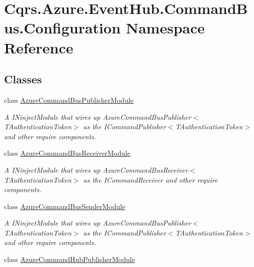 \hypertarget{namespaceCqrs_1_1Azure_1_1EventHub_1_1CommandBus_1_1Configuration}{}\section{Cqrs.\+Azure.\+Event\+Hub.\+Command\+Bus.\+Configuration Namespace Reference}
\label{namespaceCqrs_1_1Azure_1_1EventHub_1_1CommandBus_1_1Configuration}
\subsection*{Classes}
\begin{DoxyCompactItemize}
\item 
class \hyperlink{classCqrs_1_1Azure_1_1EventHub_1_1CommandBus_1_1Configuration_1_1AzureCommandBusPublisherModule}{Azure\+Command\+Bus\+Publisher\+Module}
\begin{DoxyCompactList}\small\item\em A I\+Ninject\+Module that wires up Azure\+Command\+Bus\+Publisher$<$\+T\+Authentication\+Token$>$ as the I\+Command\+Publisher$<$\+T\+Authentication\+Token$>$ and other require components. \end{DoxyCompactList}\item 
class \hyperlink{classCqrs_1_1Azure_1_1EventHub_1_1CommandBus_1_1Configuration_1_1AzureCommandBusReceiverModule}{Azure\+Command\+Bus\+Receiver\+Module}
\begin{DoxyCompactList}\small\item\em A I\+Ninject\+Module that wires up Azure\+Command\+Bus\+Receiver$<$\+T\+Authentication\+Token$>$ as the I\+Command\+Receiver and other require components. \end{DoxyCompactList}\item 
class \hyperlink{classCqrs_1_1Azure_1_1EventHub_1_1CommandBus_1_1Configuration_1_1AzureCommandBusSenderModule}{Azure\+Command\+Bus\+Sender\+Module}
\begin{DoxyCompactList}\small\item\em A I\+Ninject\+Module that wires up Azure\+Command\+Bus\+Publisher$<$\+T\+Authentication\+Token$>$ as the I\+Command\+Publisher$<$\+T\+Authentication\+Token$>$ and other require components. \end{DoxyCompactList}\item 
class \hyperlink{classCqrs_1_1Azure_1_1EventHub_1_1CommandBus_1_1Configuration_1_1AzureCommandHubPublisherModule}{Azure\+Command\+Hub\+Publisher\+Module}

\end{DoxyCompactItemize}
